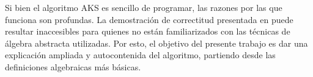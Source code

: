 Si bien el algoritmo AKS es sencillo de programar, las razones por las que funciona son profundas. La demostración de correctitud presentada en \cite{AKS04} puede resultar inaccesibles para quienes no están familiarizados con las técnicas de álgebra abstracta utilizadas. Por esto, el objetivo del presente trabajo es dar una explicación ampliada y autocontenida del algoritmo, partiendo desde las definiciones algebraicas más básicas.


